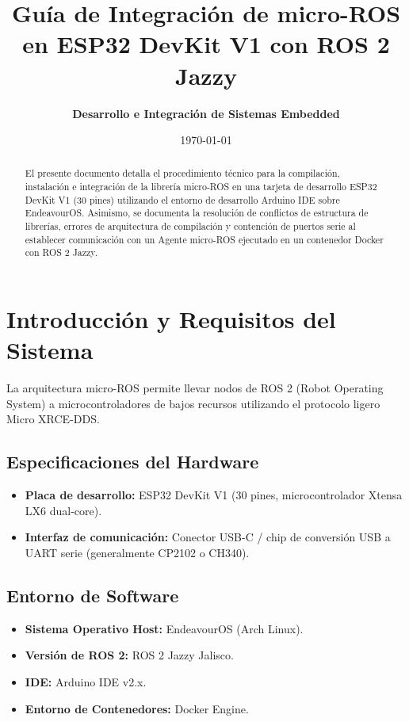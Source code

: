 \documentclass[12pt,a4paper]{article}
\title{\textbf{Guía de Integración de micro-ROS en ESP32 DevKit V1 con ROS 2 Jazzy}}
\author{\textbf{Desarrollo e Integración de Sistemas Embedded}}
\date{\today}
\begin{document}
\maketitle

\begin{abstract}
El presente documento detalla el procedimiento técnico para la compilación, instalación e integración de la librería micro-ROS en una tarjeta de desarrollo ESP32 DevKit V1 (30 pines) utilizando el entorno de desarrollo Arduino IDE sobre EndeavourOS. Asimismo, se documenta la resolución de conflictos de estructura de librerías, errores de arquitectura de compilación y contención de puertos serie al establecer comunicación con un Agente micro-ROS ejecutado en un contenedor Docker con ROS 2 Jazzy.
\end{abstract}

\tableofcontents
\newpage

\section{Introducción y Requisitos del Sistema}

La arquitectura micro-ROS permite llevar nodos de ROS 2 (Robot Operating System) a microcontroladores de bajos recursos utilizando el protocolo ligero Micro XRCE-DDS.

\subsection{Especificaciones del Hardware}
\begin{itemize}
    \item \textbf{Placa de desarrollo:} ESP32 DevKit V1 (30 pines, microcontrolador Xtensa LX6 dual-core).
    \item \textbf{Interfaz de comunicación:} Conector USB-C / chip de conversión USB a UART serie (generalmente CP2102 o CH340).
\end{itemize}

\subsection{Entorno de Software}
\begin{itemize}
    \item \textbf{Sistema Operativo Host:} EndeavourOS (Arch Linux).
    \item \textbf{Versión de ROS 2:} ROS 2 Jazzy Jalisco.
    \item \textbf{IDE:} Arduino IDE v2.x.
    \item \textbf{Entorno de Contenedores:} Docker Engine.
\end{itemize}
\end{document}
